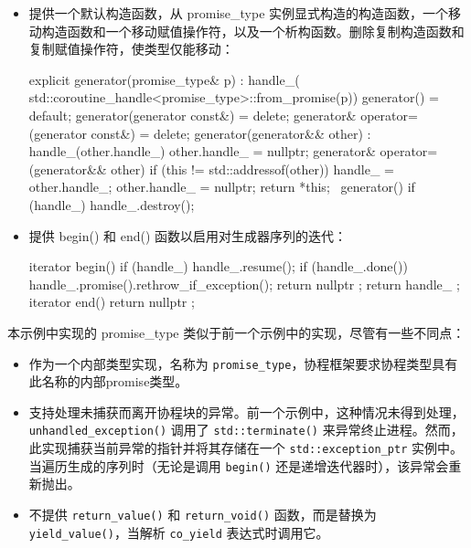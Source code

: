 \begin{itemize}
\item
提供一个默认构造函数，从 promise\_type 实例显式构造的构造函数，一个移动构造函数和一个移动赋值操作符，以及一个析构函数。删除复制构造函数和复制赋值操作符，使类型仅能移动：

\begin{cpp}
explicit generator(promise_type& p)
    : handle_(
        std::coroutine_handle<promise_type>::from_promise(p))
{}
generator() = default;
generator(generator const&) = delete;
generator& operator=(generator const&) = delete;
generator(generator&& other) : handle_(other.handle_)
{
    other.handle_ = nullptr;
}
generator& operator=(generator&& other)
{
    if (this != std::addressof(other))
    {
        handle_ = other.handle_;
        other.handle_ = nullptr;
    }
    return *this;
}
~generator()
{
    if (handle_)
    {
        handle_.destroy();
    }
}
\end{cpp}

\item
提供 begin() 和 end() 函数以启用对生成器序列的迭代：

\begin{cpp}
iterator begin()
{
    if (handle_)
    {
        handle_.resume();
        if (handle_.done())
        {
            handle_.promise().rethrow_if_exception();
            return { nullptr };
        }
    }
    return { handle_ };
}
iterator end()
{
    return { nullptr };
}
\end{cpp}
\end{itemize}


本示例中实现的 promise\_type 类似于前一个示例中的实现，尽管有一些不同点：

\begin{itemize}
\item
作为一个内部类型实现，名称为 \verb|promise_type|，协程框架要求协程类型具有此名称的内部promise类型。

\item
支持处理未捕获而离开协程块的异常。前一个示例中，这种情况未得到处理，\verb|unhandled_exception()| 调用了 \verb|std::terminate()| 来异常终止进程。然而，此实现捕获当前异常的指针并将其存储在一个 \verb|std::exception_ptr| 实例中。当遍历生成的序列时（无论是调用 \verb|begin()| 还是递增迭代器时），该异常会重新抛出。

\item
不提供 \verb|return_value()| 和 \verb|return_void()| 函数，而是替换为 \verb|yield_value()|，当解析 \verb|co_yield| 表达式时调用它。
\end{itemize}

